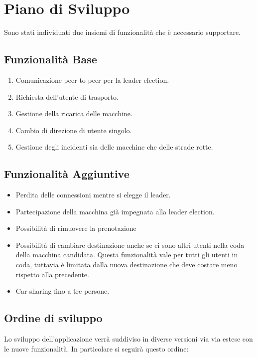 \section{Piano di Sviluppo}

Sono stati individuati due insiemi di funzionalità che è necessario supportare.
\subsection{Funzionalità Base}

\begin{enumerate}
	\item Comunicazione peer to peer per la leader election.
	\item Richiesta dell'utente di trasporto.
	\item Gestione della ricarica delle macchine.
	\item Cambio di direzione di utente singolo.
	\item Gestione degli incidenti sia delle macchine che delle strade rotte.
\end{enumerate}

\subsection{Funzionalità Aggiuntive}

\begin{itemize}
	\item Perdita delle connessioni mentre si elegge il leader.
	\item Partecipazione della macchina già impegnata alla leader election.
	\item Possibilità di rimuovere la prenotazione
	\item Possibilità di cambiare destinazione anche se ci sono altri utenti nella coda della macchina candidata. Questa funzionalità vale per tutti gli utenti in coda, tuttavia è limitata dalla nuova destinazione che deve costare meno rispetto alla precedente.
	\item Car sharing fino a tre persone.
\end{itemize}

\subsection{Ordine di sviluppo}
Lo sviluppo dell'applicazione verrà suddiviso in diverse versioni via via estese con le nuove funzionalità. In particolare si seguirà questo ordine:

